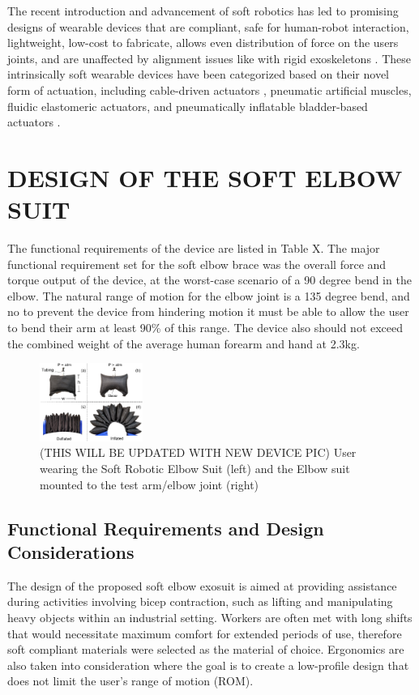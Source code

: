 \documentclass[letterpaper, 10 pt, conference]{ieeeconf}  %
\begin{document}
The recent introduction and advancement of soft robotics has led to promising designs of wearable devices that are compliant, safe for human-robot interaction, lightweight, low-cost to fabricate, allows even distribution of force on the users joints, and are unaffected by alignment issues like with rigid exoskeletons \cite{ADEM:ADEM201700016}. These intrinsically soft wearable devices have been categorized based on their novel form of actuation, including cable-driven actuators \cite{Gopura2016,Dinh2017,Xiloyannis2017,Ding2017}, pneumatic artificial muscles\cite{Park2014c,CALDWELL2007,Al-fahaam2017}, fluidic elastomeric actuators\cite{Polygerinos,Koh2017,Chen2017h}, and pneumatically inflatable bladder-based actuators \cite{Kim2017,Sridar2017,Simpson2017,Koh2017}.

\section{DESIGN OF THE SOFT ELBOW SUIT}
The functional requirements of the device are listed in Table X.  The major functional requirement set for the soft elbow brace was the overall force and torque output of the device,  at the worst-case scenario of a 90 degree bend in the elbow.  The natural range of motion for the elbow joint is a 135 degree bend, and no to prevent the device from hindering motion it must be able to allow the user to bend their arm at least 90\% of this range.  The device also should not exceed the combined weight of the average human forearm and hand at 2.3kg.

\begin{figure}[t!]
\centering
\includegraphics[width=0.3\textwidth]{V1_device.PNG}
\caption{(THIS WILL BE UPDATED WITH NEW DEVICE PIC) User wearing the Soft Robotic Elbow Suit (left) and the Elbow suit mounted to the test arm/elbow joint (right)}
\label{fig:user}
\end{figure}


\subsection{Functional Requirements and Design Considerations}
The design of the proposed soft elbow exosuit is aimed at providing assistance during activities involving bicep contraction, such as lifting and manipulating heavy objects within an industrial setting. Workers are often met with long shifts that would necessitate maximum comfort for extended periods of use, therefore soft compliant materials were selected as the material of choice. Ergonomics are also taken into consideration where the goal is to create a low-profile design that does not limit the user’s range of motion (ROM). 
\end{document}
